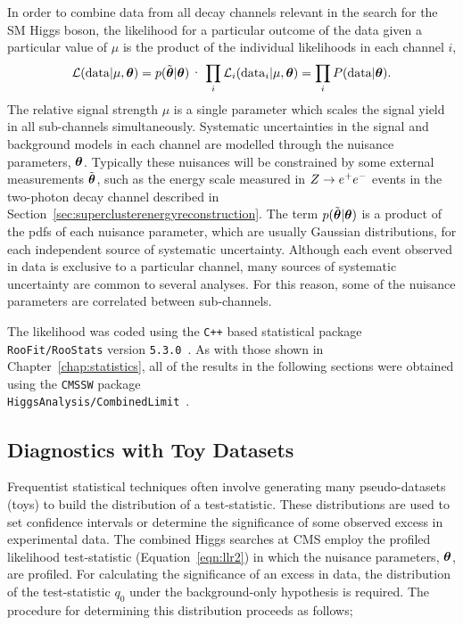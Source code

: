 In order to combine data from all decay channels relevant in the search for the
SM Higgs boson, the likelihood for a particular outcome of the data given a particular
value of $\mu$ is the product of the individual likelihoods in each channel $i$,
\begin{equation}
\mathcal{L}(\mathrm{data}|\mu,\boldth)= p(\boldthmeas|\boldth)\cdot\prod_{i}\mathcal{L}_{i}(\mathrm{data}_{i}|\mu,\boldth)
= \prod_{i}P(\mathrm{data}|\boldth).
\label{eqn:likelihood}
\end{equation}
The relative signal strength $\mu$ is a single parameter which scales the signal
yield in all sub-channels simultaneously. 
Systematic uncertainties in the signal and background models in each channel
are modelled through the nuisance parameters, ${\boldsymbol{\theta}}$. Typically these nuisances
will be constrained by some external measurements $\tilde{{\boldsymbol{\theta}}}$, such as the energy scale
measured in $Z\rightarrow e^{+}e^{-}$ events in the two-photon decay channel described in 
Section~\ref{sec:superclusterenergyreconstruction}. 
The term $p(\tilde{{\boldsymbol{\theta}}}|{\boldsymbol{\theta}})$ is a product of the pdfs of each nuisance parameter, 
which are usually Gaussian distributions, for each independent source of systematic
uncertainty.
Although each event observed in data is exclusive to a particular channel, 
many sources of systematic uncertainty are common to several analyses. For this
reason, some of the nuisance parameters are correlated between sub-channels.

The likelihood was coded using the \texttt{C++} based statistical package \texttt{RooFit/RooStats} version \texttt{5.3.0}~\citep{roofit}. As with those shown in 
Chapter~\ref{chap:statistics}, all of the results in the following sections were 
obtained using the \texttt{CMSSW} package\\
\texttt{HiggsAnalysis/CombinedLimit}~\citep{combinationstwiki}.

\subsection{Diagnostics with Toy Datasets}
\label{sec:diagnostics}
Frequentist statistical techniques often involve generating many pseudo-datasets (toys)
 to build the distribution of a test-statistic. 
These distributions are used to set confidence intervals or determine the significance of
some observed excess in experimental data. The combined Higgs searches at CMS employ the
profiled likelihood test-statistic (Equation~\ref{eqn:llr2}) in which the nuisance parameters,
${\boldsymbol{\theta}}$, are profiled. 
For calculating the significance of an excess in data, the distribution
of the test-statistic $q_{0}$ under the background-only hypothesis is required. 
The procedure for determining this distribution proceeds as follows;

